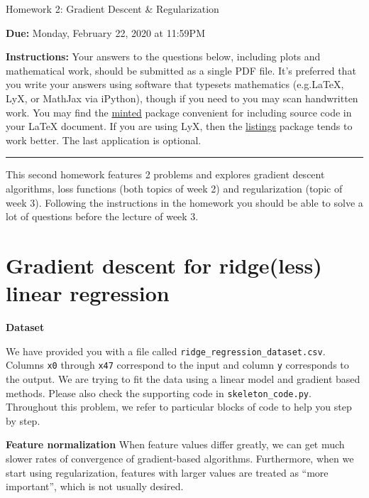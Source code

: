 \documentclass{article}
\newcommand{\nyuparagrah}[1]{\textcolor{nyupurple}{\large #1}}
\newcommand{\ruleskip}{\bigskip\hrule\bigskip}
\begin{document}

\pagestyle{myheadings} 

\begin{center}
{\Large
Homework 2: Gradient Descent \& Regularization
} 
\end{center}

{
{ \color{nyupurple} \textbf{Due:} Monday, February 22, 2020 at 11:59PM} 
} 

\textbf{Instructions: }Your answers to the questions below, including plots and mathematical
 work, should be submitted as a single PDF file.  It's preferred that you write your answers using software that typesets mathematics (e.g.LaTeX, LyX, or MathJax via iPython), though if you need to you may scan handwritten work.  You may find the \href{https://github.com/gpoore/minted}{minted} package convenient for including source code in your LaTeX document.  If you are using LyX, then the \href{https://en.wikibooks.org/wiki/LaTeX/Source_Code_Listings}{listings} package tends to work better. The last application is optional.

\ruleskip

This second homework features 2 problems and explores gradient descent algorithms, loss functions (both topics of week 2) and regularization (topic of week 3). Following the instructions in the homework you should be able to solve a lot of questions before the lecture of week 3. 


\section{\large Gradient descent for ridge(less) linear regression}

\nyuparagrah{\bf Dataset} 

We have provided you with a file called \texttt{ridge\_regression\_dataset.csv}. Columns \texttt{x0} through \texttt{x47} correspond to the input and column \texttt{y} corresponds to the output. We are trying to fit the data using a linear model and gradient based methods. Please also check the supporting code in \texttt{skeleton\_code.py}. Throughout this problem, we refer to particular blocks of code to help you step by step. 


\nyuparagrah{\bf Feature normalization}
When feature values differ greatly, we can get much slower rates of
convergence of gradient-based algorithms. Furthermore, when we start
using regularization, features with
larger values are treated as ``more important'', which is not usually
desired.  
\end{document}
